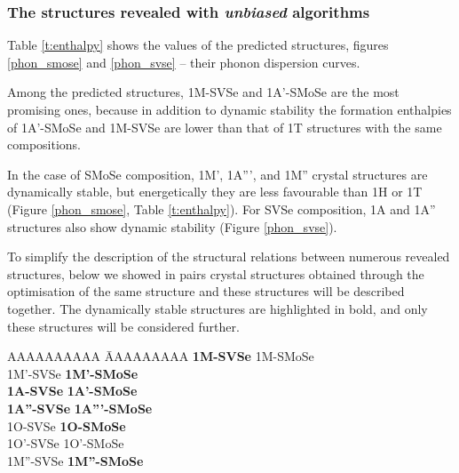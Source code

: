 \documentclass[a4paperm]{article}
\begin{document}
\subsubsection{The structures revealed with {\it unbiased} algorithms}
Table \ref{t:enthalpy} shows the values of the predicted structures, figures \ref{phon_smose} and  \ref{phon_svse} -- their phonon dispersion curves. 

Among the predicted structures, 1M-SVSe and 1A'-SMoSe are the most promising ones, because in addition to dynamic stability the formation enthalpies of 1A'-SMoSe and 1M-SVSe are lower than that of 1T structures with the same compositions.


In the case of SMoSe composition, 1M', 1A''', and 1M'' crystal structures are dynamically stable, but energetically they are less favourable than 1H or 1T (Figure \ref{phon_smose}, Table \ref{t:enthalpy}).
For SVSe composition, 1A and 1A'' structures also show dynamic stability (Figure \ref{phon_svse}). 

To simplify the description of the structural relations between numerous revealed structures, below we showed in pairs crystal structures obtained through the optimisation of the same structure and these structures will be described together.
The dynamically stable structures are highlighted in bold, and only these structures will be considered further.


\begin{tabbing} 
	AAAAAAAAAA \= AAAAAAAAA \kill
	{\bf 1M-SVSe} \> 1M-SMoSe \\
	1M'-SVSe \> {\bf 1M'-SMoSe} \\
	{\bf 1A-SVSe} \> {\bf 1A'-SMoSe} \\
	{\bf 1A''-SVSe} \> {\bf 1A'''-SMoSe} \\
	
	1O-SVSe \> {\bf 1O-SMoSe} \\
	1O'-SVSe \> 1O'-SMoSe \\
	1M''-SVSe \> {\bf 1M''-SMoSe}
\end{tabbing}
\end{document}

